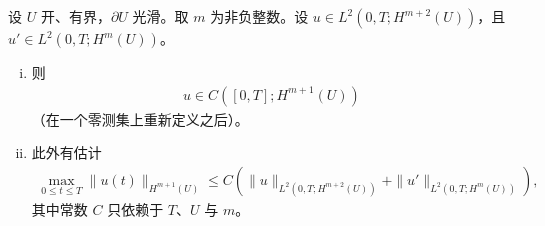 \documentclass[../../main.tex]{subfiles}
\begin{document}
\begin{theorem}[映入更好空间的映射]\label{theorem:ch05-更好空间映射}设 $U$ 开、有界，$\partial U$ 光滑。取 $m$ 为非负整数。设 $u\in L^{2}(0,T;H^{m+2}(U))$，且 $u'\in L^{2}(0,T;H^{m}(U))$。
\begin{enumerate}[(i)]
\item 则
\begin{align*}
u\in C([0,T];H^{m+1}(U))
\end{align*}
（在一个零测集上重新定义之后）。
\item 此外有估计
\begin{align}
\max_{0\leqslant t\leqslant T}\|u(t)\|_{H^{m+1}(U)}
\leqslant C\left(\|u\|_{L^{2}(0,T;H^{m+2}(U))}+\|u'\|_{L^{2}(0,T;H^{m}(U))}\right),
\end{align}
其中常数 $C$ 只依赖于 $T$、$U$ 与 $m$。
\end{enumerate}
\end{theorem}
\end{document}
